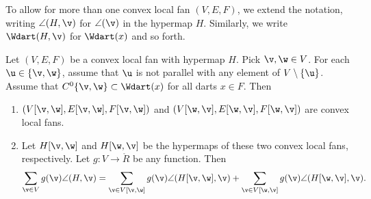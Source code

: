 To allow for more than one convex local fan $(V,E,F)$, we  extend
the notation, writing $\angle(H,\v)$ for $\angle(\v)$ in the hypermap
$H$.  Similarly, we write $\Wdart(H,\v)$ for $\Wdart(x)$ and so
forth.  %
%


\begin{lemma}[slicing]\label{lemma:slice} Let
$(V,E,F)$ be a convex local fan with hypermap $H$.  Pick $\v,\w\in V$. For
each $\u\in \{\v,\w\}$, assume that $\u$ is not parallel with  any
element of $V\setminus\{\u\}$.  Assume that $C^0\{\v,\w\}\subset
\Wdart(x)$ for all darts $x\in F$.  Then
\begin{enumerate}\wasitemize 
\item $(V[\v,\w],E[\v,\w],F[\v,\w])$ and
$(V[\w,\v],E[\w,\v],F[\w,\v])$ are convex local fans.
\item Let $H[\v,\w]$ and $H[\w,\v]$ be the hypermaps of these two
  convex local fans, respectively.  Let $g:V\to\ring{R}$ be any
  function.  Then
\[ 
  \sum_{\v\in V} g(\v)\angle(H,\v) 
  = \sum_{\v\in V[\v,\w]}g(\v)\angle(H[\v,\w],\v) 
  + \sum_{\v\in V[\w,\v]}g(\v)\angle(H[\w,\v],\v).
\] 
\end{enumerate}\wasitemize 
\end{lemma}
%
%

